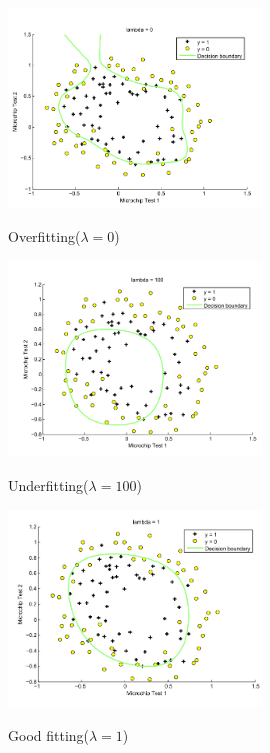 \documentclass{article} %
\begin{document}
\begin{figure}[h]
  \centering
  \includegraphics[width=0.6\textwidth]{lambda0}\\
  \caption{Overfitting($\lambda=0$)}\label{fig:lambda-0}
\end{figure}


\begin{figure}[h]
  \centering
  \includegraphics[width=0.6\textwidth]{lambda100}\\
  \caption{Underfitting($\lambda=100$)}\label{fig:lambda-100}
\end{figure}


\begin{figure}[h]
  \centering
  \includegraphics[width=0.6\textwidth]{lambda1}\\
  \caption{Good fitting($\lambda=1$)}\label{fig:lambda-1}
\end{figure}
\end{document}
